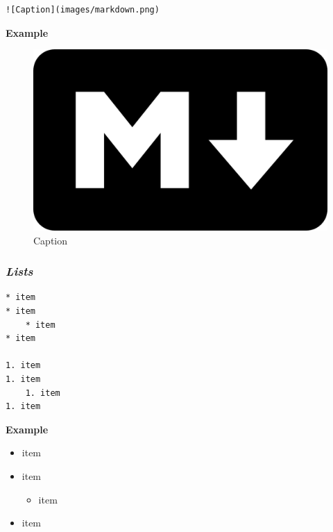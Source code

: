 \documentclass[journal,]{IEEEtran}
\makeatletter
\providecommand{\tightlist}{%
  \setlength{\itemsep}{0pt}\setlength{\parskip}{0pt}}
\newcounter{figno}
\newenvironment{fignos:no-prefix-figure-caption}{
  \caption@ifcompatibility{}{
    \let\oldthefigure\thefigure
    \let\oldtheHfigure\theHfigure
    \renewcommand{\thefigure}{figno:\thefigno}
    \renewcommand{\theHfigure}{figno:\thefigno}
    \stepcounter{figno}
    \captionsetup{labelformat=empty}
  }
}{
  \caption@ifcompatibility{}{
    \captionsetup{labelformat=default}
    \let\thefigure\oldthefigure
    \let\theHfigure\oldtheHfigure
    \addtocounter{figure}{-1}
  }
}
\makeatother
\begin{document}
\begin{verbatim}
![Caption](images/markdown.png)
\end{verbatim}

\textbf{Example}

\begin{fignos:no-prefix-figure-caption}

\begin{figure}
\centering
\includegraphics{images/markdown.png}
\caption{Caption}
\end{figure}

\end{fignos:no-prefix-figure-caption}

\hypertarget{lists}{%
\subsubsection{\texorpdfstring{\textbf{\emph{Lists}}}{Lists}}\label{lists}}

\begin{verbatim}
* item
* item
    * item
* item

1. item
1. item
    1. item
1. item
\end{verbatim}

\textbf{Example}

\begin{itemize}
\tightlist
\item
  item
\item
  item

  \begin{itemize}
  \tightlist
  \item
    item
  \end{itemize}
\item
  item
\end{itemize}
\end{document}
